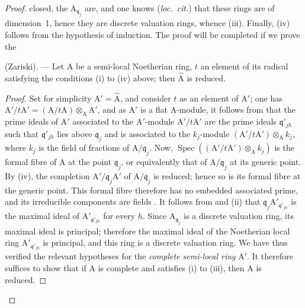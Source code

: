 \begin{proof}

closed, the $\mathrm{A}_{\mathfrak{q}_j}$ are, and one knows (\emph{loc.\ cit.}) that these rings are of dimension~1, hence they are discrete valuation rings, whence (iii). Finally, (iv) follows from the hypothesis of induction. The proof will be completed if we prove the

\begin{lemma}[7.6.4.1]
\label{IV.7.6.4.1}
(Zariski). --- Let $\mathrm{A}$ be a semi-local Noetherian ring, $t$ an element of its radical satisfying the conditions (i) to (iv) above; then $\widehat{\mathrm{A}}$ is reduced.
\end{lemma}

\begin{proof}
Set for simplicity $\mathrm{A}'=\widehat{\mathrm{A}}$, and consider $t$ as an element of $\mathrm{A}'$; one has $\mathrm{A}'/t\mathrm{A}'=(\mathrm{A}/t\mathrm{A})\otimes_\mathrm{A}\mathrm{A}'$, and as $\mathrm{A}'$ is a flat $\mathrm{A}$-module, it follows from  that the prime ideals of $\mathrm{A}'$ associated to the $\mathrm{A}'$-module $\mathrm{A}'/t\mathrm{A}'$ are the prime ideals $\mathfrak{q}'_{jh}$ such that $\mathfrak{q}'_{jh}$ lies above $\mathfrak{q}_j$ and is associated to the $k_j$-module $(\mathrm{A}'/t\mathrm{A}')\otimes_\mathrm{A} k_j$, where $k_j$ is the field of fractions of $\mathrm{A}/\mathfrak{q}_j$. Now, $\operatorname{Spec}((\mathrm{A}'/t\mathrm{A}')\otimes_\mathrm{A} k_j)$ is the formal fibre of $\mathrm{A}$ at the point $\mathfrak{q}_j$, or equivalently that of $\mathrm{A}/\mathfrak{q}_j$ at its generic point. By (iv), the completion $\mathrm{A}'/\mathfrak{q}_j\mathrm{A}'$ of $\mathrm{A}/\mathfrak{q}_j$ is reduced; hence so is its formal fibre at the generic point. This formal fibre therefore has no embedded associated prime, and its irreducible components are fields . It follows from  and (ii) that $\mathfrak{q}_j\mathrm{A}'_{\mathfrak{q}'_{jh}}$ is the maximal ideal of $\mathrm{A}'_{\mathfrak{q}'_{jh}}$ for every $h$. Since $\mathrm{A}_{\mathfrak{q}_j}$ is a discrete valuation ring, its maximal ideal is principal; therefore the maximal ideal of the Noetherian local ring $\mathrm{A}'_{\mathfrak{q}'_{jh}}$ is principal, and this ring is a discrete valuation ring. We have thus verified the relevant hypotheses for the \emph{complete semi-local ring} $\mathrm{A}'$. It therefore suffices to show that if $\mathrm{A}$ is complete and satisfies (i) to (iii), then $\mathrm{A}$ is reduced.


\end{proof}
\end{proof}
